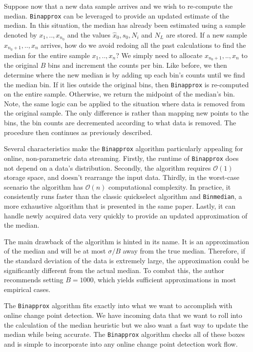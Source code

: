 Suppose now that a new data sample arrives and we wish to re-compute the median. \texttt{Binapprox} can be leveraged to provide an updated estimate of the median. In this situation, the median has already been estimated using a sample denoted by $x_1,..,x_{n_0}$ and the values $\hat{x}_0, s_0, N_i$ and  $N_L$ are stored. If a new sample $x_{n_0+1},..,x_{n}$ arrives, how do we avoid redoing all the past calculations to find the median for the entire sample $x_1,..,x_n$? We simply need to allocate $x_{n_0+1},..,x_{n}$  to the original $B$ bins and increment the counts per bin. Like before, we then determine where the new median is by adding up each bin's counts until we find the median bin. If it lies outside the original bins, then \texttt{Binapprox} is re-computed on the entire sample. Otherwise, we return the midpoint of the median's bin. Note, the same logic can be applied to the situation where data is removed from the original sample. The only difference is rather than mapping new points to the bins, the bin counts are decremented according to what data is removed. The procedure then continues as previously described.

Several characteristics make the \texttt{Binapprox} algorithm particularly appealing for online, non-parametric data streaming.  Firstly, the runtime of \texttt{Binapprox} does not depend on a data's distribution. Secondly, the algorithm requires $\mathcal{O}(1)$ storage space, and doesn't rearrange the input data. Thirdly, in the worst-case scenario the algorithm has $\mathcal{O}(n)$ computational complexity. In practice, it consistently runs faster than the classic quickselect algorithm and \texttt{Binmedian}, a more exhaustive  algorithm that is presented in the same paper. Lastly, it can handle newly acquired data very quickly to provide an updated approximation of the median. 

The main drawback of the algorithm is hinted in its name. It is an approximation of the median and will be at most $\sigma / B$ away from the true median. Therefore, if the standard deviation of the data is extremely large,
the approximation could be significantly different from the actual median. To combat this, the author recommends setting $B=1000$, which yields sufficient approximations in most empirical cases.

The  \texttt{Binapprox} algorithm fits exactly into what we want to accomplish with online change point detection. We have incoming data that we want to roll into the calculation of the median heuristic but we also want a fast way to update the median while being accurate. The \texttt{Binapprox} algorithm checks all of these boxes and is simple to incorporate into any online change point detection work flow. 

